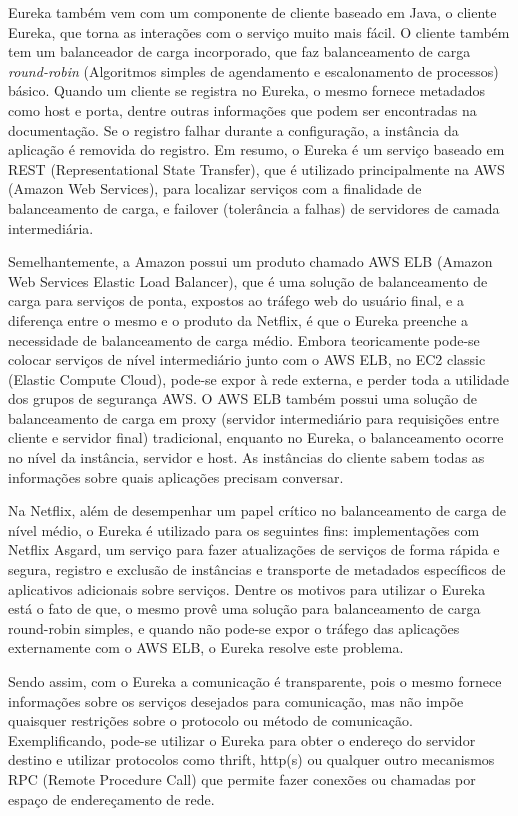 \documentclass[journal]{IEEEtran}
\begin{document}
Eureka também vem com um componente de cliente baseado em Java, o cliente Eureka, que torna as interações com o serviço muito mais fácil. O cliente também tem um balanceador de carga incorporado, que faz balanceamento de carga \emph{round-robin} (Algoritmos simples de agendamento e escalonamento de processos) básico. Quando um cliente se registra no Eureka, o mesmo fornece metadados como host e porta, dentre outras informações que podem ser encontradas na documentação. Se o registro falhar durante a configuração, a instância da aplicação é removida do registro. Em resumo, o Eureka é um serviço baseado em REST (Representational State Transfer), que é utilizado principalmente na AWS (Amazon Web Services), para localizar serviços com a finalidade de balanceamento de carga, e failover (tolerância a falhas) de servidores de camada intermediária. 

Semelhantemente, a Amazon possui um produto chamado AWS ELB (Amazon Web Services Elastic Load Balancer), que é uma solução de balanceamento de carga para serviços de ponta, expostos ao tráfego web do usuário final, e a diferença entre o mesmo e o produto da Netflix, é que o Eureka preenche a necessidade de balanceamento de carga médio. Embora teoricamente pode-se colocar serviços de nível intermediário junto com o AWS ELB, no EC2 classic (Elastic Compute Cloud), pode-se expor à rede externa, e perder toda a utilidade dos grupos de segurança AWS. O AWS ELB  também possui uma solução de balanceamento de carga em proxy (servidor intermediário para requisições entre cliente e servidor final) tradicional, enquanto no Eureka, o balanceamento ocorre no nível da instância, servidor e host. As instâncias do cliente sabem todas as informações sobre quais aplicações precisam conversar.

Na Netflix, além de desempenhar um papel crítico no balanceamento de carga de nível médio, o Eureka é utilizado para os seguintes fins: implementações com Netflix Asgard, um serviço para fazer atualizações de serviços de forma rápida e segura, registro e exclusão de instâncias e transporte de metadados específicos de aplicativos adicionais sobre serviços. Dentre os motivos para utilizar o Eureka está o fato de que, o mesmo provê uma solução para balanceamento de carga round-robin simples, e quando não pode-se expor o tráfego das aplicações externamente com o AWS ELB, o Eureka resolve este problema.

Sendo assim, com o Eureka a comunicação é transparente, pois o mesmo fornece informações sobre os serviços desejados para comunicação, mas não impõe quaisquer restrições sobre o protocolo ou método de comunicação. Exemplificando, pode-se utilizar o Eureka para obter o endereço do servidor destino e utilizar protocolos como thrift, http(s) ou qualquer outro mecanismos RPC (Remote Procedure Call) que permite fazer conexões ou chamadas por espaço de endereçamento de rede. 
\end{document}
